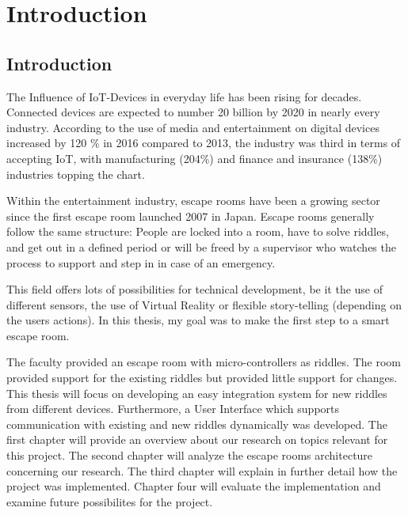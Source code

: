 
\chapter{Introduction} %

\label{Chapter1} %


\section{Introduction}

The Influence of IoT-Devices in everyday life has been rising for decades.
Connected devices are expected to number 20 billion \parencite{gartner0} by 2020 in nearly every industry.
According to \parencite{verizon} the use of media and entertainment on digital devices increased by 120 \% in 2016 compared to 2013,
the industry was third in terms of accepting IoT,
with manufacturing (204\%) and finance and insurance (138\%) industries topping the chart.

Within the entertainment industry, escape rooms have been a growing sector since the first escape room launched 2007 in Japan.
Escape rooms generally follow the same structure: People are locked into a room, have to solve riddles,
and get out in a defined period or will be freed by a supervisor who watches the process to support
and step in in case of an emergency.

This field offers lots of possibilities for technical development, be it the use of different sensors, the use of Virtual Reality or flexible story-telling (depending on the users actions).
In this thesis, my goal was to make the first step to a smart escape room.

The faculty provided an escape room with micro-controllers as riddles.
The room provided support for the existing riddles but provided little support for changes.
This thesis will focus on developing an easy integration system for new riddles from different devices.
Furthermore, a User Interface which supports communication with existing and new riddles dynamically was developed.
The first chapter will provide an overview about our research on topics relevant for this project. 
The second chapter will analyze the escape rooms architecture concerning our research. 
The third chapter will explain in further detail how the project was implemented. 
Chapter four will evaluate the implementation and examine future possibilites for the project.


